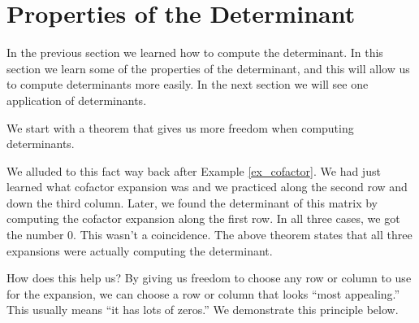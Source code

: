 \section{Properties of the Determinant}\label{sec:determinant_properties}


In the previous section we learned how to compute the determinant. In this section we learn some of the properties of the determinant, and this will allow us to compute determinants more easily. In the next section we will see one application of  determinants.

We start with a theorem that gives us more freedom when computing determinants.


We alluded to this fact way back after Example \ref{ex_cofactor}. We had just learned what cofactor expansion was and we practiced along the second row and down the third column. Later, we found the determinant of this matrix by computing the cofactor expansion along the first row. In all three cases, we got the number 0. This wasn't a coincidence. The above theorem states that all three expansions were actually computing the determinant.

How does this help us? By giving us freedom to choose any row or column to use for the expansion, we can choose a row or column that looks ``most appealing.'' This usually means ``it has lots of zeros.'' We demonstrate this principle below.\\


